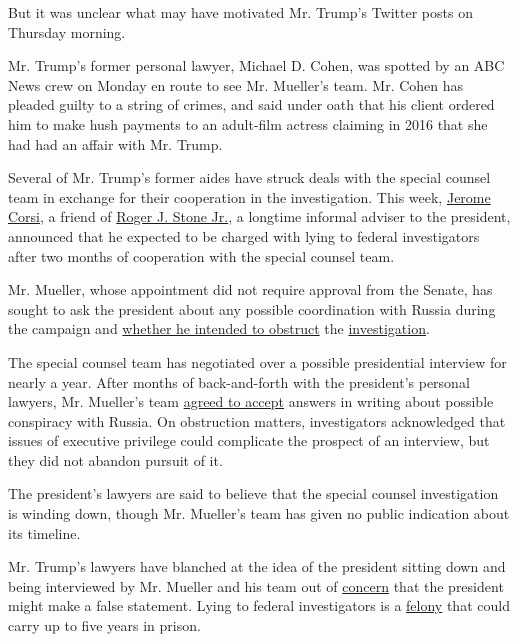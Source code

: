 But it was unclear what may have motivated Mr. Trump's Twitter posts on
Thursday morning.

Mr. Trump's former personal lawyer, Michael D. Cohen, was spotted by an
ABC News crew on Monday en route to see Mr. Mueller's team. Mr. Cohen
has pleaded guilty to a string of crimes, and said under oath that his
client ordered him to make hush payments to an adult-film actress
claiming in 2016 that she had had an affair with Mr. Trump.

Several of Mr. Trump's former aides have struck deals with the special
counsel team in exchange for their cooperation in the investigation.
This week,
\href{https://www.nytimes.com/2018/11/12/us/politics/jerome-corsi-predicts-indictment.html}{Jerome
Corsi}, a friend of
\href{https://www.nytimes.com/2018/11/01/us/politics/roger-stone-trump-campaign-mueller-wikileaks.html?action=click\&module=RelatedCoverage\&pgtype=Article\&region=Footer}{Roger
J. Stone Jr.}, a longtime informal adviser to the president, announced
that he expected to be charged with lying to federal investigators after
two months of cooperation with the special counsel team.

Mr. Mueller, whose appointment did not require approval from the Senate,
has sought to ask the president about any possible coordination with
Russia during the campaign and
\href{https://www.nytimes.com/2018/07/26/us/politics/trump-tweets-mueller-obstruction.html}{whether
he intended to obstruct} the
\href{https://www.nytimes.com/interactive/2018/09/20/us/politics/russia-interference-election-trump-clinton.html}{investigation}.

The special counsel team has negotiated over a possible presidential
interview for nearly a year. After months of back-and-forth with the
president's personal lawyers, Mr. Mueller's team
\href{https://www.nytimes.com/2018/09/04/us/politics/mueller-trump-russia-investigation.html}{agreed
to accept} answers in writing about possible conspiracy with Russia. On
obstruction matters, investigators acknowledged that issues of executive
privilege could complicate the prospect of an interview, but they did
not abandon pursuit of it.

The president's lawyers are said to believe that the special counsel
investigation is winding down, though Mr. Mueller's team has given no
public indication about its timeline.

Mr. Trump's lawyers have blanched at the idea of the president sitting
down and being interviewed by Mr. Mueller and his team out of
\href{https://www.nytimes.com/2018/02/05/us/politics/trump-lawyers-special-counsel-interview.html}{concern}
that the president might make a false statement. Lying to federal
investigators is a
\href{https://www.law.cornell.edu/uscode/text/18/1001}{felony} that
could carry up to five years in prison.

